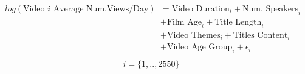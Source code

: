 \begin{align}
\begin{split}
log(\text{Video $i$ Average Num.Views/Day})&=\text{Video Duration}_i+\text{Num. Speakers}_i\\
&+\text{Film Age}_i+\text{Title Length}_i\\
&+\text{Video Themes}_i+\text{Titles Content}_i\\
&+\text{Video Age Group}_i+\epsilon_i\\
\end{split}
\label{poisson_simple_eqn}
\end{align}
\begin{equation*}
i=\{1,..,2550\}
\end{equation*}